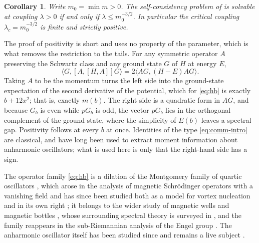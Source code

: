 \documentclass[11pt,reqno]{amsart}
\theoremstyle{plain}
\newtheorem{corollary}[theorem]{Corollary}
\theoremstyle{definition}
\theoremstyle{remark}
\numberwithin{equation}{section}
\begin{document}
\begin{corollary}
  \label{cor:lambda}
  Write $m_0=\min m>0$. The self-consistency problem of
  \cite{baez1992renormalized} is solvable at coupling $\lambda>0$ if and only
  if $\lambda\le m_0^{-3/2}$. In particular the critical coupling
  $\lambda_c=m_0^{-3/2}$ is finite and strictly positive.
\end{corollary}

The proof of positivity is short and uses no property of the parameter, which
is what removes the restriction to the tails. For any symmetric operator $A$
preserving the Schwartz class and any ground state $G$ of $H$ at energy $E$,
\begin{equation}
  \label{eq:comm-intro}
  \langle G,[A,[H,A]]G\rangle=2\langle AG,(H-E)AG\rangle .
\end{equation}
Taking $A$ to be the momentum turns the left side into the ground-state
expectation of the second derivative of the potential, which for \eqref{eq:hb}
is exactly $b+12x^2$; that is, exactly $m(b)$. The right side is a quadratic
form in $AG$, and because $G_b$ is even while $pG_b$ is odd, the vector $pG_b$
lies in the orthogonal complement of the ground state, where the simplicity of
$E(b)$ leaves a spectral gap. Positivity follows at every $b$ at once.
Identities of the type \eqref{eq:comm-intro} are classical, and have long been
used to extract moment information about anharmonic oscillators; what is used
here is only that the right-hand side has a sign.

The operator family \eqref{eq:hb} is a dilation of the Montgomery family of
quartic oscillators \cite{montgomery1995hearing}, which arose in the analysis
of magnetic Schr\"odinger operators with a vanishing field and has since been
studied both as a model for vortex nucleation \cite{Pan_2002so} and in its own
right \cite{Helffer_2010tm,Helffer_2010sp}; it belongs to the wider study of
magnetic wells and magnetic bottles \cite{Helffer_1996sa,HELFFER_2004mb},
whose surrounding spectral theory is surveyed in \cite{Fournais_Book}, and the
family reappears in the sub-Riemannian analysis of the Engel group
\cite{Bahouri_2023ss}. The anharmonic oscillator
itself has been studied since \cite{Bender_1969ao,simon1970coupling} and
remains a live subject \cite{Turbiner_2021ao}.
\end{document}
